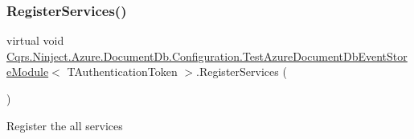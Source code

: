 \subsubsection{\texorpdfstring{Register\+Services()}{RegisterServices()}}
{\footnotesize\ttfamily virtual void \hyperlink{classCqrs_1_1Ninject_1_1Azure_1_1DocumentDb_1_1Configuration_1_1TestAzureDocumentDbEventStoreModule}{Cqrs.\+Ninject.\+Azure.\+Document\+Db.\+Configuration.\+Test\+Azure\+Document\+Db\+Event\+Store\+Module}$<$ T\+Authentication\+Token $>$.Register\+Services (\begin{DoxyParamCaption}{ }\end{DoxyParamCaption})\hspace{0.3cm}{\ttfamily [virtual]}}



Register the all services 

